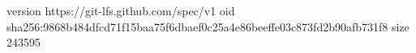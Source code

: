 version https://git-lfs.github.com/spec/v1
oid sha256:9868b484dfcd71f15baa75f6dbaef0c25a4e86beeffe03c873fd2b90afb731f8
size 243595
